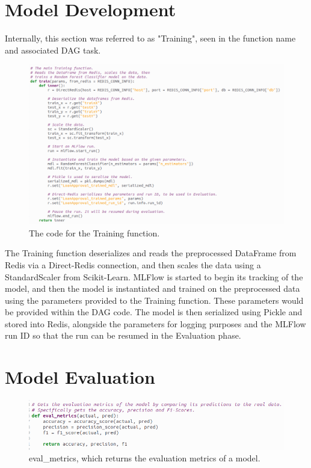 \documentclass[12pt]{report}
\begin{document}
\section{Model Development}\label{sec:ImpDevelopment}
Internally, this section was referred to as "Training", seen in the function name and associated 
DAG task.

\begin{figure}[H]
    \centering
    \includegraphics[width=\linewidth]{Implementation/.Code/PipelineFunctions/Training.png}
    \caption{The code for the Training function.}
    \label{fig:TrainingCode}
\end{figure}

The Training function deserializes and reads the preprocessed DataFrame from Redis via a Direct-Redis 
connection, and then scales the data using a StandardScaler from Scikit-Learn. MLFlow is started 
to begin its tracking of the model, and then the model is instantiated and trained on the preprocessed data 
using the parameters provided to the Training function. These parameters would be provided within the DAG code.
The model is then serialized using Pickle and stored into Redis, alongside the parameters for logging purposes 
and the MLFlow run ID so that the run can be resumed in the Evaluation phase.


\section{Model Evaluation}\label{sec:ImpEvaluation}

\begin{figure}[H]
    \centering
    \includegraphics[width=\linewidth]{Implementation/.Code/PipelineFunctions/Evaluation1.png}
    \caption{eval\_metrics, which returns the evaluation metrics of a model.}
    \label{fig:Evaluation1}
\end{figure}
\end{document}
